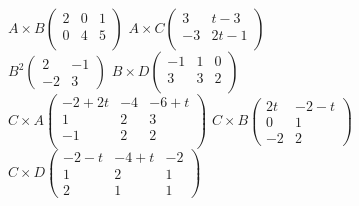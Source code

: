 \documentclass{HM}
\begin{document}
\begin{enumerate}
$A\times B\begin{pmatrix}
	2 & 0 & 1 \\
	0 & 4 & 5 \\
\end{pmatrix}$
$A\times C\begin{pmatrix}
	3 & t-3\\
	-3 & 2t-1\\
\end{pmatrix}$\\

$B^2\begin{pmatrix}
	2 & -1 \\
	-2 & 3
\end{pmatrix}$
$B\times D\begin{pmatrix}
	-1 & 1 & 0\\
	3 & 3 & 2\\
\end{pmatrix}$\\

$C\times A\begin{pmatrix}
	-2+2t & -4 & -6+t\\
	1 & 2 & 3\\
	-1 & 2 & 2\\
\end{pmatrix}$
$C\times B\begin{pmatrix}
	2t & -2-t\\
	0 & 1\\
	-2 & 2
\end{pmatrix}$
$C\times D\begin{pmatrix}
	-2-t & -4+t &-2\\
	1 & 2 & 1\\
	2 & 1 & 1
\end{pmatrix}$\\


\end{enumerate}
\end{document}
